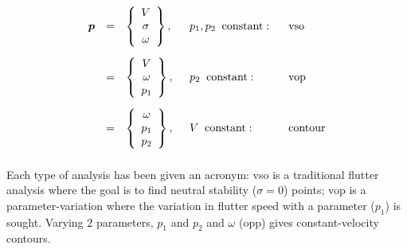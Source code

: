 \documentclass[11pt,openany,twoside]{book}
\numberwithin{equation}{section}		%
\newcommand{\Vector}[1]{\boldsymbol{#1}}
\begin{document}
\begin{equation}\label{eqn:combinations}
\begin{array}{lclll}
\Vector{p} & = &
	\left\{ \begin{array}{c}
		V \\
		\sigma \\
		\omega
	\end{array}\right\}, \;\; & p_1, p_2 \;\;\text{constant}: & \hspace{0.1in} \text{vso} \\[0.3in]
	  & = & 
	\left\{ \begin{array}{c}
		V \\
		\omega \\
		p_1
	\end{array}\right\}, \;\; & p_2 \;\;\text{constant}: & \hspace{0.1in} \text{vop} \\[0.3in]
	  & = & 
	\left\{ \begin{array}{c}
		\omega \\
		p_1 \\
		p_2
	\end{array}\right\}, \;\; & V \;\;\text{constant}: & \hspace{0.1in} \text{contour} \\[0.3in]
\end{array}
\end{equation}
Each type of analysis has been given an acronym: vso  is a traditional
flutter analysis where the goal is to find neutral stability
($\sigma = 0$) points; vop is a parameter-variation where the variation
in flutter speed with a parameter ($p_1$) is sought. Varying 2 parameters, $p_1$ and
$p_2$ and $\omega$ (opp) gives constant-velocity contours.
\end{document}
